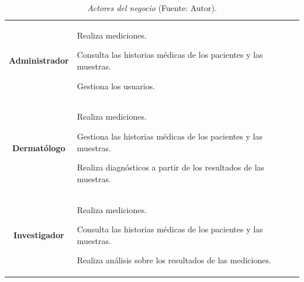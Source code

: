 		\begin{table}[h]
		\small
		\caption[Actores del negocio]{\textit{Actores del negocio} (Fuente: Autor).}
		\centering
		\setlength{\extrarowheight}{\altocelda}
		\begin{tabulary}{\anchotabla}{|c|J|}
			\hline
			 & \\ \hline
			\textbf{Administrador} &
			
			Realiza mediciones.
			
			Consulta las historias m\'{e}dicas de los pacientes y las muestras.
			
			Gestiona los usuarios.
		\\ \hline
			\textbf{Dermat\'{o}logo} &
			
			Realiza mediciones.
			
			Gestiona las historias m\'{e}dicas de los pacientes y las muestras.
			
			Realiza diagn\'{o}sticos a partir de los resultados de las muestras.
		\\ \hline
			\textbf{Investigador} &
			
			Realiza mediciones.
			
			Consulta las historias m\'{e}dicas de los pacientes y las muestras.
			
			Realiza an\'{a}lisis sobre los resultados de las mediciones.\\ \hline
		\end{tabulary}
	\end{table}
	
